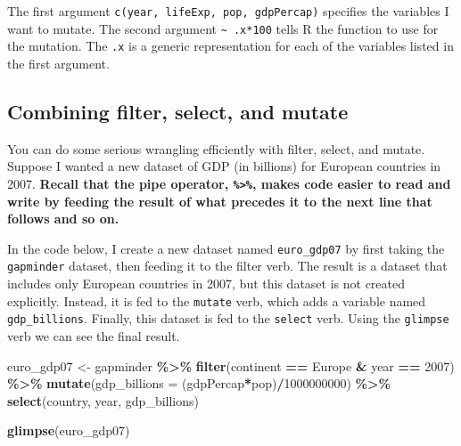 \documentclass[
]{book}
\makeatletter
\newenvironment{Shaded}{\begin{snugshade}}{\end{snugshade}}
\newcommand{\AttributeTok}[1]{\textcolor[rgb]{0.27,0.27,0.27}{#1}}
\newcommand{\DecValTok}[1]{\textcolor[rgb]{0.06,0.06,0.06}{#1}}
\newcommand{\FunctionTok}[1]{\textcolor[rgb]{0.27,0.27,0.27}{\textbf{#1}}}
\newcommand{\NormalTok}[1]{#1}
\newcommand{\OtherTok}[1]{\textcolor[rgb]{0.37,0.37,0.37}{#1}}
\newcommand{\SpecialCharTok}[1]{\textcolor[rgb]{0.43,0.43,0.43}{\textbf{#1}}}
\newcommand{\StringTok}[1]{\textcolor[rgb]{0.5,0.5,0.5}{#1}}
\newenvironment{kframe}{%
\medskip{}
\setlength{\fboxsep}{.8em}
 \def\at@end@of@kframe{}%
 \ifinner\ifhmode%
  \def\at@end@of@kframe{\end{minipage}}%
  \begin{minipage}{\columnwidth}%
 \fi\fi%
 \def\FrameCommand##1{\hskip\@totalleftmargin \hskip-\fboxsep
 \colorbox{shadecolor}{##1}\hskip-\fboxsep
     \hskip-\linewidth \hskip-\@totalleftmargin \hskip\columnwidth}%
 \MakeFramed {\advance\hsize-\width
   \@totalleftmargin\z@ \linewidth\hsize
   \@setminipage}}%
 {\par\unskip\endMakeFramed%
 \at@end@of@kframe}
\renewenvironment{Shaded}{\begin{kframe}}{\end{kframe}}
\makeatother
\begin{document}
The first argument \texttt{c(year,\ lifeExp,\ pop,\ gdpPercap)} specifies the variables I want to mutate. The second argument \texttt{\textasciitilde{}\ .x*100} tells R the function to use for the mutation. The \texttt{.x} is a generic representation for each of the variables listed in the first argument.

\hypertarget{combining-filter-select-and-mutate}{%
\subsection{Combining filter, select, and mutate}\label{combining-filter-select-and-mutate}}

You can do some serious wrangling efficiently with filter, select, and mutate. Suppose I wanted a new dataset of GDP (in billions) for European countries in 2007. \textbf{Recall that the pipe operator, \texttt{\%\textgreater{}\%}, makes code easier to read and write by feeding the result of what precedes it to the next line that follows and so on.}

In the code below, I create a new dataset named \texttt{euro\_gdp07} by first taking the \texttt{gapminder} dataset, then feeding it to the filter verb. The result is a dataset that includes only European countries in 2007, but this dataset is not created explicitly. Instead, it is fed to the \texttt{mutate} verb, which adds a variable named \texttt{gdp\_billions}. Finally, this dataset is fed to the \texttt{select} verb. Using the \texttt{glimpse} verb we can see the final result.

\begin{Shaded}
\begin{Highlighting}[]
\NormalTok{euro\_gdp07 }\OtherTok{\textless{}{-}}\NormalTok{ gapminder }\SpecialCharTok{\%\textgreater{}\%} 
  \FunctionTok{filter}\NormalTok{(continent }\SpecialCharTok{==} \StringTok{\textquotesingle{}Europe\textquotesingle{}} \SpecialCharTok{\&}\NormalTok{ year }\SpecialCharTok{==} \DecValTok{2007}\NormalTok{) }\SpecialCharTok{\%\textgreater{}\%} 
  \FunctionTok{mutate}\NormalTok{(}\AttributeTok{gdp\_billions =}\NormalTok{ (gdpPercap}\SpecialCharTok{*}\NormalTok{pop)}\SpecialCharTok{/}\DecValTok{1000000000}\NormalTok{) }\SpecialCharTok{\%\textgreater{}\%} 
  \FunctionTok{select}\NormalTok{(country, year, gdp\_billions)}

\FunctionTok{glimpse}\NormalTok{(euro\_gdp07)}
\end{Highlighting}
\end{Shaded}
\end{document}
